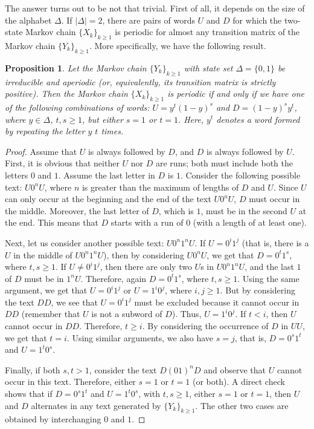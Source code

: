 \documentclass{amsart}
\newtheorem{Proposition}{Proposition}
\newcommand{\1}{{\mathbf{1}}}
\begin{document}
The answer turns out to be not that trivial. First of all, it depends on the size of
the alphabet $\Delta$. If $|\Delta|=2$, there are pairs of words $U$ and $D$ for
which the two-state Markov chain $\{X_k\}_{k\geq 1}$ is periodic for almost any transition
matrix of the Markov chain $\{Y_k\}_{k\geq 1}$. More specifically, we have the following result.
\begin{Proposition}
Let the Markov chain $\{Y_k\}_{k\geq 1}$ with state set $\Delta=\{0,1\}$ be irreducible and
aperiodic (or, equivalently, its transition matrix is strictly positive).
Then the Markov chain $\{X_k\}_{k\geq 1}$ is periodic if and only if
we have one of the following combinations of words: $U = y^t(1-y)^s$ and
$D = (1-y)^sy^t$, where $y \in \Delta$, $t, s \geq 1$, but either $s = 1$ or
$t = 1$. Here, $y^t$ denotes a word formed by repeating the letter $y$ $t$ times.
\end{Proposition}
\begin{proof}
Assume that $U$ is always followed by $D$, and $D$ is always followed by $U$.
First, it is obvious that neither $U$ nor $D$ are runs; both must include both
the letters $0$ and $1$. Assume the last letter in $D$ is $1$. Consider the following
possible text: $U0^nU$, where $n$ is greater than the maximum of  lengths of $D$ and $U$.
Since $U$ can only occur at the beginning and the end of the text $U0^nU$,
$D$ must occur in the middle. Moreover, the last letter of $D$, which is $1$,
must be in the second $U$ at the end.  This means that $D$ starts with a run of $0$
(with a length of at least one).

Next, let us consider another possible text: $U0^n1^nU$. If $U=0^i1^j$ (that is, there
is a $U$ in the middle of $U0^n1^nU$), then by considering $U0^nU$, we get that $D=0^t1^s$,
where $t, s \geq 1$. If $U\neq 0^i1^j$, then there are only two $U$s in $U0^n1^nU$, and the
last $1$ of $D$ must be in $1^nU$. Therefore, again $D=0^t1^s$, where $t, s \geq 1$.
Using the same argument, we get that $U=0^i1^j$ or $U=1^i0^j$, where $i, j \geq 1$.
But by considering the text $DD$, we see that $U=0^i1^j$ must be excluded because
it cannot occur in $DD$ (remember that $U$ is not a subword of $D$). Thus, $U=1^i0^j$. If $t<i$,
then $U$ cannot occur in $DD$. Therefore, $t \geq i$.
By considering the occurrence of $D$ in $UU$, we get that $t=i$.
Using similar arguments, we also have $s=j$, that is, $D=0^s1^t$ and $U=1^t0^s$.

Finally, if both $s,t>1$, consider the text $D(01)^nD$ and observe that $U$ cannot
occur in this text. Therefore, either $s=1$ or $t=1$ (or both). A direct check
shows that if $D=0^s1^t$ and $U=1^t0^s$, with $t,s\geq 1$, either $s = 1$ or
$t = 1$, then $U$ and $D$ alternates in any text generated by $\{Y_k\}_{k\geq 1}$.
The other two cases are obtained by interchanging $0$ and $1$.
\end{proof}
\end{document}
